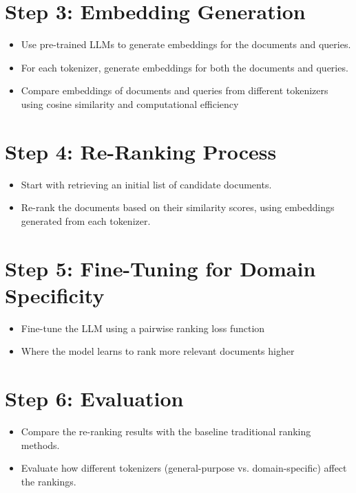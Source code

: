 \section*{Step 3: Embedding Generation}
\begin{itemize}
    \item Use pre-trained LLMs to generate embeddings for the documents and queries.
    \item For each tokenizer, generate embeddings for both the documents and queries.
    \item Compare embeddings of documents  and queries from different tokenizers using cosine similarity and computational efficiency
\end{itemize}

\section*{Step 4: Re-Ranking Process}
\begin{itemize}
    \item Start with retrieving an initial list of candidate documents.
    \item Re-rank the documents based on their similarity scores, using embeddings generated from each tokenizer.
\end{itemize}

\section*{Step 5: Fine-Tuning for Domain Specificity}
\begin{itemize}
    \item Fine-tune the LLM using a pairwise ranking loss function
    \item Where the model learns to rank more relevant documents higher
\end{itemize}

\section*{Step 6: Evaluation}
\begin{itemize}
  \item Compare the re-ranking results with the baseline traditional ranking methods.
  \item Evaluate how different tokenizers (general-purpose vs. domain-specific) affect the rankings.
\end{itemize}